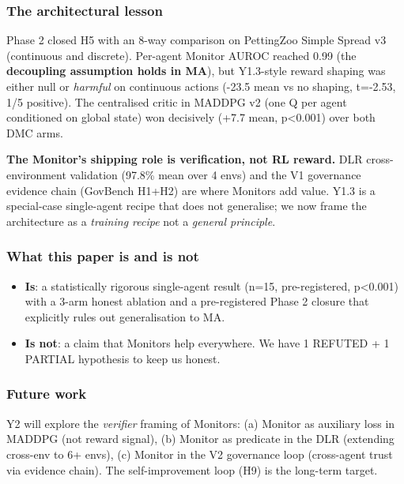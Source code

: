 \documentclass[
]{article}
\providecommand{\tightlist}{%
  \setlength{\itemsep}{0pt}\setlength{\parskip}{0pt}}
\begin{document}
\subsubsection{The architectural lesson}\label{the-architectural-lesson}

Phase 2 closed H5 with an 8-way comparison on PettingZoo Simple Spread
v3 (continuous and discrete). Per-agent Monitor AUROC reached 0.99 (the
\textbf{decoupling assumption holds in MA}), but Y1.3-style reward
shaping was either null or \emph{harmful} on continuous actions (-23.5
mean vs no shaping, t=-2.53, 1/5 positive). The centralised critic in
MADDPG v2 (one Q per agent conditioned on global state) won decisively
(+7.7 mean, p\textless0.001) over both DMC arms.

\textbf{The Monitor's shipping role is verification, not RL reward.} DLR
cross-environment validation (97.8\% mean over 4 envs) and the V1
governance evidence chain (GovBench H1+H2) are where Monitors add value.
Y1.3 is a special-case single-agent recipe that does not generalise; we
now frame the architecture as a \emph{training recipe} not a
\emph{general principle}.

\subsubsection{What this paper is and is
not}\label{what-this-paper-is-and-is-not}

\begin{itemize}
\tightlist
\item
  \textbf{Is}: a statistically rigorous single-agent result (n=15,
  pre-registered, p\textless0.001) with a 3-arm honest ablation and a
  pre-registered Phase 2 closure that explicitly rules out
  generalisation to MA.
\item
  \textbf{Is not}: a claim that Monitors help everywhere. We have 1
  REFUTED + 1 PARTIAL hypothesis to keep us honest.
\end{itemize}

\subsubsection{Future work}\label{future-work}

Y2 will explore the \emph{verifier} framing of Monitors: (a) Monitor as
auxiliary loss in MADDPG (not reward signal), (b) Monitor as predicate
in the DLR (extending cross-env to 6+ envs), (c) Monitor in the V2
governance loop (cross-agent trust via evidence chain). The
self-improvement loop (H9) is the long-term target.
\end{document}
